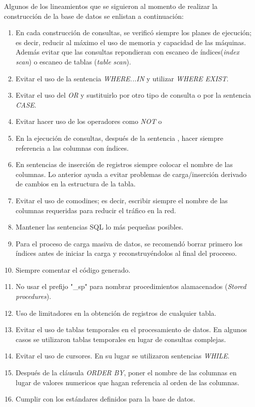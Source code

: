 Algunos de los lineamientos que se siguieron al momento de realizar la construcción de la base de datos se enlistan a continuación:
\begin{enumerate}
\item En cada construcción de consultas, se verificó siempre los planes de ejecución; es decir, reducir al máximo 
el uso de memoria y capacidad de las máquinas. Además evitar que las consultas repondieran con escaneo de índices(\textit{index scan}) 
o escaneo de tablas (\textit{table scan}). 
\item Evitar el uso de la sentencia \textit{WHERE...IN} y utilizar \textit{WHERE EXIST}.
\item Evitar el uso del \textit{OR} y sustituirlo por otro tipo de consulta o por la sentencia \textit{CASE}.
\item Evitar hacer uso de los operadores como \textit{NOT} o \<\>
\item En la ejecución de consultas, después de la sentencia , hacer siempre referencia a las columnas con índices.
\item En sentencias de inserción de registros  siempre colocar el nombre de las columnas. Lo anterior ayuda a evitar 
problemas de carga/inserción derivado de cambios en la estructura de la tabla.
\item Evitar el uso de comodines; es decir, escribir siempre el nombre de las columnas requeridas para reducir el tráfico en la red.
\item Mantener las sentencias SQL lo más pequeñas posibles.
\item Para el proceso de carga masiva de datos, se recomendó borrar primero los índices antes de iniciar la carga y reconstruyéndolos al final del proceeso.
\item Siempre comentar el código generado.
\item No usar el prefijo "\_sp" para nombrar procedimientos alamacenados (\textit{Stored procedures}).
\item Uso de limitadores en la obtención de registros de cualquier tabla.
\item Evitar el uso de tablas temporales en el procesamiento de datos. En algunos casos se utilizaron tablas temporales en lugar de consultas complejas.
\item Evitar el uso de cursores. En su lugar se utilizaron sentencias \textit{WHILE}.
\item Después de la cláusula \textit{ORDER BY}, poner el nombre de las columnas en lugar de valores numericos que hagan referencia al orden de las columnas.
\item Cumplir con los estándares definidos para la base de datos.
\end{enumerate}

